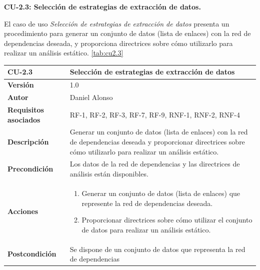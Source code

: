 \textbf{CU-2.3: Selección de estrategias de extracción de datos.}

El caso de uso \textit{Selección de estrategias de extracción de datos} presenta un procedimiento para generar un conjunto de datos
(lista de enlaces) con la red de dependencias deseada, y proporciona directrices sobre cómo
utilizarlo para realizar un análisis estático. \ref{tab:cu2.3}

\begin{table}[p]
	\centering
	\begin{tabularx}{\linewidth}{ p{} p{} }
		\toprule
		\textbf{CU-2.3}               & \textbf{Selección de estrategias de extracción de datos}                                                   \\
		\toprule
		\textbf{Versión}              & 1.0                                                                                                        \\
		\textbf{Autor}                & Daniel Alonso                                                                                              \\
		\textbf{Requisitos asociados} & RF-1, RF-2, RF-3, RF-7, RF-9, RNF-1, RNF-2, RNF-4                                                          \\
		\textbf{Descripción}          & Generar un conjunto de datos (lista de enlaces) con la red de dependencias
		deseada y proporcionar directrices sobre cómo utilizarlo para realizar un análisis estático.                                               \\
		\textbf{Precondición}         & Los datos de la red de dependencias y las directrices de análisis están
		disponibles.                                                                                                                               \\
		\textbf{Acciones}             & \begin{enumerate}
			                                \item Generar un conjunto de datos (lista de enlaces) que represente la red de dependencias deseada.
			                                \item Proporcionar directrices sobre cómo utilizar el conjunto de datos para realizar un análisis estático.
		                                \end{enumerate} \\
		\textbf{Postcondición}        & Se dispone de un conjunto de datos que representa la red de dependencias

\end{tabularx}
\end{table}
